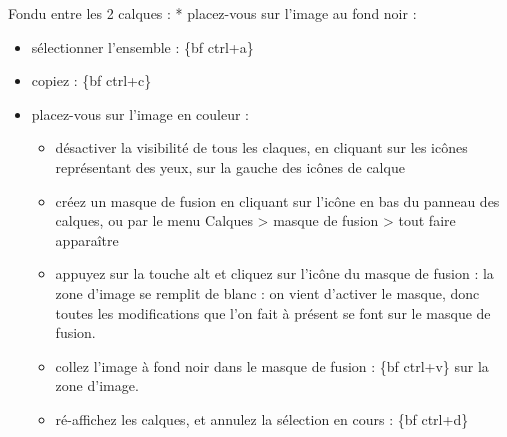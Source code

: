 \documentclass[a4paper,12pt,french]{sphinxmanual}
\begin{document}
\noindent{}

Fondu entre les 2 calques :
* placez-vous sur l'image au fond noir :
\begin{itemize}
\item {} 
sélectionner l'ensemble : \{bf ctrl+a\}

\item {} 
copiez : \{bf ctrl+c\}

\end{itemize}
\begin{itemize}
\item {} 
placez-vous sur l'image en couleur :
\begin{itemize}
\item {} 
désactiver la visibilité de tous les claques, en cliquant sur les icônes représentant des yeux, sur la gauche des icônes de calque

\item {} 
créez un masque de fusion en cliquant sur l'icône en bas du panneau des calques, ou par le menu Calques \textgreater{} masque de fusion \textgreater{} tout faire apparaître

\item {} 
appuyez sur la touche alt et cliquez sur l'icône du masque de fusion : la zone d'image se remplit de blanc : on vient d'activer le masque, donc toutes les modifications que l'on fait à présent se font sur le masque de fusion.

\item {} 
collez l'image à fond noir dans le masque de fusion : \{bf ctrl+v\} sur la zone d'image.

\item {} 
ré-affichez les calques, et annulez la sélection en cours : \{bf ctrl+d\}

\end{itemize}

\end{itemize}
\end{document}
